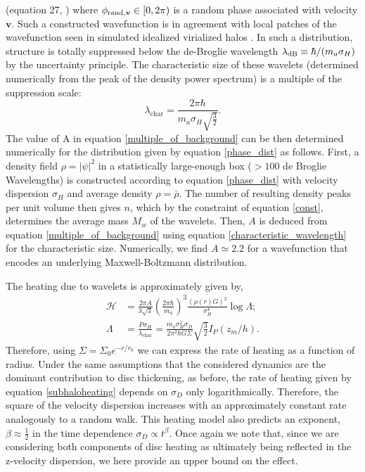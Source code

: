 \documentclass[usenatbib]{mnras}
\begin{document}
(equation 27, \cite{Schrodinger-Poisson}) where $\phi_{{\rm rand},\mathbf{v}}\in[0,2\pi)$ is a random phase associated with velocity $\mathbf{v}$.
Such a constructed wavefunction is in agreement with local patches of the wavefunction seen in simulated idealized virialized halos \citep{BECDM}.
In such a distribution, structure is totally suppressed below the de-Broglie wavelength $\lambda_{\rm dB} \equiv \hbar/(m_a \sigma_H)$ by the uncertainty principle.
The characteristic size of these wavelets (determined numerically from the peak of the density power spectrum) is a multiple of the suppression scale:
\begin{equation} \label{characteristic_wavelength}
\lambda_{\text{char}} = \frac{ 2 \pi \hbar}{m_a \sigma_H \sqrt{\frac{3}{2}}}.
\end{equation}
The value of A in equation \eqref{multiple_of_background} can be then determined numerically for the distribution given by equation \eqref{phase_dist} as follows. First, a density field $\rho = |\psi|^2$ in a statistically large-enough box ($> 100$ de Broglie Wavelengths) is constructed according to equation \eqref{phase_dist} with velocity dispersion $\sigma_H$ and average density $\rho = \bar{\rho}$. The number of resulting density peaks per unit volume then gives $n$, which by the constraint of equation \eqref{const}, determines the average mass $M_w$ of the wavelets. Then, $A$ is deduced from equation \eqref{multiple_of_background} using equation \eqref{characteristic_wavelength} for the characteristic size. Numerically, we find $A\simeq 2.2$ for a wavefunction that encodes an underlying Maxwell-Boltzmann distribution.
\par
The heating due to wavelets is approximately given by,
\begin{subequations} \label{FDMheating}
\begin{align}
\mathcal{H} & = \frac{2 \pi A}{3 \sqrt{3}} \left( \frac{2 \pi \hbar }{m_a} \right)^3 \frac{(\rho(r) G)^2}{\sigma_H^4} \log{\Lambda} ;
\\
\Lambda & = \frac{P \sigma_H}{\lambda_{\text{char}}} = \frac{m_a \sigma_H^2 \sigma_D}{2 \pi^2 \hbar G \Sigma} \sqrt{\tfrac{3}{2}} I_P(z_m / h) .
\end{align}
\end{subequations}
Therefore, using $\Sigma = \Sigma_0 e^{-r/r_0}$ we can express the rate of heating as a function of radius. Under the same assumptions that the considered dynamics are the dominant contribution to disc thickening, as before, the rate of heating given by equation \eqref{subhaloheating} depends on $\sigma_D$ only logarithmically. Therefore, the square of the velocity dispersion increases with an approximately constant rate analogously to a random walk. This heating model also predicts an exponent, $\beta \approx \tfrac{1}{2}$ in the time dependence $\sigma_D \propto t^{\beta}$. Once again we note that, since we are considering both components of disc heating as ultimately being reflected in the z-velocity dispersion, we here provide an upper bound on the effect. 
\end{document}
